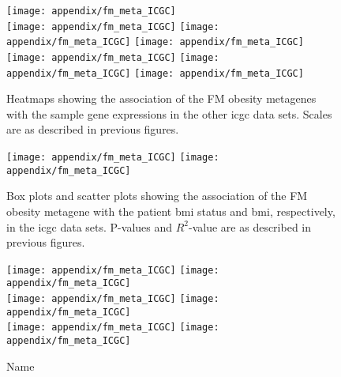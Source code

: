 \begin{appendices}
	\begin{figure}[htpb]
		\centering
		\texttt{[image: appendix/fm\_meta\_ICGC]}\\
		\texttt{[image: appendix/fm\_meta\_ICGC]}
		\texttt{[image: appendix/fm\_meta\_ICGC]}
		\texttt{[image: appendix/fm\_meta\_ICGC]}\\
		\texttt{[image: appendix/fm\_meta\_ICGC]}
		\texttt{[image: appendix/fm\_meta\_ICGC]}
		\texttt{[image: appendix/fm\_meta\_ICGC]}\\
		\caption[Association of the FM obesity metagene with the sample gene expressions in the other \gls{icgc} data]{Heatmaps showing the association of the FM obesity metagenes  with the sample gene expressions in the other \gls{icgc} data sets.
		Scales are as described in previous figures.}
		\label{fig:appendix/fm_ob_meta_heatmap_icgc}
	\end{figure}

	\begin{figure}[htpb]
		\centering
		\texttt{[image: appendix/fm\_meta\_ICGC]}
		\hfill
		\texttt{[image: appendix/fm\_meta\_ICGC]}\\
		\caption[Association of the FM obesity metagene with the patient \gls{bmi}/\gls{bmi} status in the other \gls{icgc} data]{Box plots and scatter plots showing the association of the FM obesity metagene with the patient \gls{bmi} status  and \gls{bmi}, respectively, in the \gls{icgc} data sets.
		P-values and $R^2$-value are as described in previous figures.}
		\label{fig:appendix/fm_ob_meta_box_scatter_icgc}
	\end{figure}

	\begin{figure}[htpb]
		\ContinuedFloat
		\captionsetup{list=off,format=cont}
		\centering
		\texttt{[image: appendix/fm\_meta\_ICGC]}
		\hfill
		\texttt{[image: appendix/fm\_meta\_ICGC]}\\
		\texttt{[image: appendix/fm\_meta\_ICGC]}
		\hfill
		\texttt{[image: appendix/fm\_meta\_ICGC]}\\
		\texttt{[image: appendix/fm\_meta\_ICGC]}
		\hfill
		\texttt{[image: appendix/fm\_meta\_ICGC]}\\
		\caption{Name}
	\end{figure}


\end{appendices}

